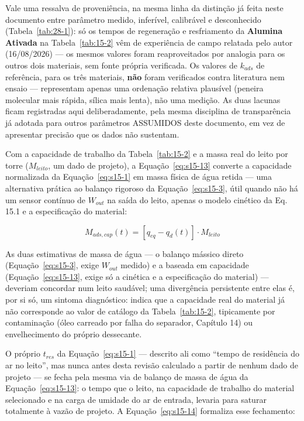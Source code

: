 \documentclass[12pt,a4paper]{article}
\numberwithin{equation}{section}
\numberwithin{table}{section}
\numberwithin{figure}{section}
\begin{document}
{		Vale uma ressalva de proveniência, na mesma linha da distinção já feita neste documento entre parâmetro medido, inferível, calibrável e desconhecido (Tabela~\ref{tab:28-1}): só os tempos de regeneração e resfriamento da \textbf{Alumina Ativada} na Tabela~\ref{tab:15-2} vêm de experiência de campo relatada pelo autor (16/08/2026) — os mesmos valores foram reaproveitados por analogia para os outros dois materiais, sem fonte própria verificada. Os valores de $k_{ads}$ de referência, para os três materiais, \textbf{não} foram verificados contra literatura nem ensaio — representam apenas uma ordenação relativa plausível (peneira molecular mais rápida, sílica mais lenta), não uma medição. As duas lacunas ficam registradas aqui deliberadamente, pela mesma disciplina de transparência já adotada para outros parâmetros ASSUMIDOS deste documento, em vez de apresentar precisão que os dados não sustentam.

		Com a capacidade de trabalho da Tabela~\ref{tab:15-2} e a massa real do leito por torre ($M_{leito}$, um dado de projeto), a Equação~\eqref{eq:s15-13} converte a capacidade normalizada da Equação~\eqref{eq:s15-1} em massa física de água retida — uma alternativa prática ao balanço rigoroso da Equação~\eqref{eq:s15-3}, útil quando não há um sensor contínuo de $W_{out}$ na saída do leito, apenas o modelo cinético da Eq. 15.1 e a especificação do material:

		\begin{equation}\label{eq:s15-13}
		M_{ads,cap}(t) = \left[q_{eq} - q_d(t)\right] \cdot M_{leito}
		\end{equation}

		As duas estimativas de massa de água — o balanço mássico direto (Equação~\eqref{eq:s15-3}, exige $W_{out}$ medido) e a baseada em capacidade (Equação~\eqref{eq:s15-13}, exige só a cinética e a especificação do material) — deveriam concordar num leito saudável; uma divergência persistente entre elas é, por si só, um sintoma diagnóstico: indica que a capacidade real do material já não corresponde ao valor de catálogo da Tabela~\ref{tab:15-2}, tipicamente por contaminação (óleo carreado por falha do separador, Capítulo 14) ou envelhecimento do próprio dessecante.

		O próprio $t_{res}$ da Equação~\eqref{eq:s15-1} — descrito ali como ``tempo de residência do ar no leito'', mas nunca antes desta revisão calculado a partir de nenhum dado de projeto — se fecha pela mesma via de balanço de massa de água da Equação~\eqref{eq:s15-13}: o tempo que o leito, na capacidade de trabalho do material selecionado e na carga de umidade do ar de entrada, levaria para saturar totalmente à vazão de projeto. A Equação~\eqref{eq:s15-14} formaliza esse fechamento:

}
\end{document}
